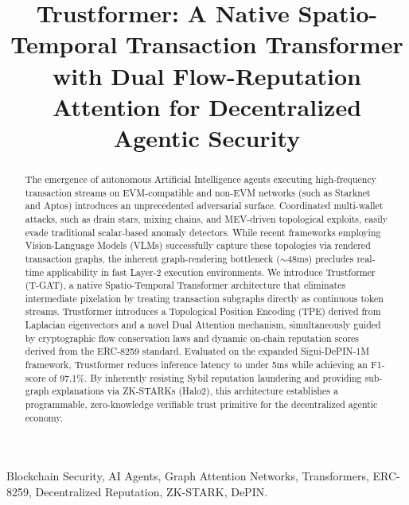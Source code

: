 \documentclass[conference,10pt]{IEEEtran}
\begin{document}
\title{Trustformer: A Native Spatio-Temporal Transaction Transformer with Dual Flow-Reputation Attention for Decentralized Agentic Security}

\author{
}

\maketitle

\begin{abstract}
The emergence of autonomous Artificial Intelligence agents executing high-frequency transaction streams on EVM-compatible and non-EVM networks (such as Starknet and Aptos) introduces an unprecedented adversarial surface. Coordinated multi-wallet attacks, such as drain stars, mixing chains, and MEV-driven topological exploits, easily evade traditional scalar-based anomaly detectors. While recent frameworks employing Vision-Language Models (VLMs) successfully capture these topologies via rendered transaction graphs, the inherent graph-rendering bottleneck ($\sim$48ms) precludes real-time applicability in fast Layer-2 execution environments. We introduce Trustformer (T-GAT), a native Spatio-Temporal Transformer architecture that eliminates intermediate pixelation by treating transaction subgraphs directly as continuous token streams. Trustformer introduces a Topological Position Encoding (TPE) derived from Laplacian eigenvectors and a novel Dual Attention mechanism, simultaneously guided by cryptographic flow conservation laws and dynamic on-chain reputation scores derived from the ERC-8259 standard. Evaluated on the expanded Sigui-DePIN-1M framework, Trustformer reduces inference latency to under 5ms while achieving an F1-score of 97.1\%. By inherently resisting Sybil reputation laundering and providing sub-graph explanations via ZK-STARKs (Halo2), this architecture establishes a programmable, zero-knowledge verifiable trust primitive for the decentralized agentic economy.
\end{abstract}

\begin{IEEEkeywords}
Blockchain Security, AI Agents, Graph Attention Networks, Transformers, ERC-8259, Decentralized Reputation, ZK-STARK, DePIN.
\end{IEEEkeywords}
\end{document}
